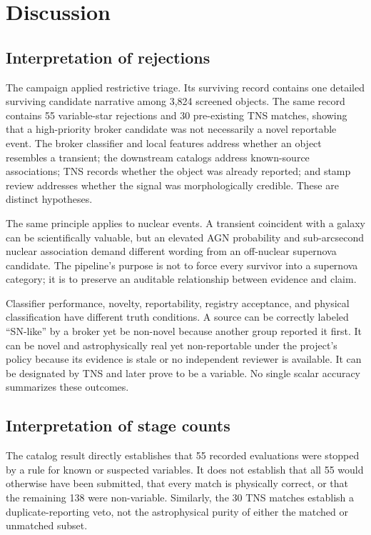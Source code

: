 \documentclass[11pt]{article}
\begin{document}


\section{Discussion}
\label{sec:discussion}

\subsection{Interpretation of rejections}

The campaign applied restrictive triage. Its surviving record contains one detailed surviving candidate narrative among 3,824 screened objects. The same record contains 55 variable-star rejections and 30 pre-existing TNS matches, showing that a high-priority broker candidate was not necessarily a novel reportable event. The broker classifier and local features address whether an object resembles a transient; the downstream catalogs address known-source associations; TNS records whether the object was already reported; and stamp review addresses whether the signal was morphologically credible. These are distinct hypotheses.

The same principle applies to nuclear events. A transient coincident with a galaxy can be scientifically valuable, but an elevated AGN probability and sub-arcsecond nuclear association demand different wording from an off-nuclear supernova candidate. The pipeline's purpose is not to force every survivor into a supernova category; it is to preserve an auditable relationship between evidence and claim.

Classifier performance, novelty, reportability, registry acceptance, and physical classification have different truth conditions. A source can be correctly labeled ``SN-like'' by a broker yet be non-novel because another group reported it first. It can be novel and astrophysically real yet non-reportable under the project's policy because its evidence is stale or no independent reviewer is available. It can be designated by TNS and later prove to be a variable. No single scalar accuracy summarizes these outcomes.

\subsection{Interpretation of stage counts}

The catalog result directly establishes that 55 recorded evaluations were stopped by a rule for known or suspected variables. It does not establish that all 55 would otherwise have been submitted, that every match is physically correct, or that the remaining 138 were non-variable. Similarly, the 30 TNS matches establish a duplicate-reporting veto, not the astrophysical purity of either the matched or unmatched subset.
\end{document}
